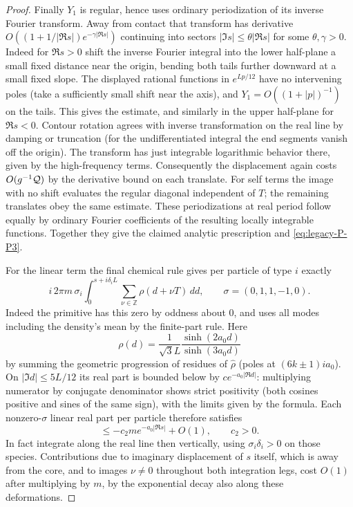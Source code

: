 \begin{proof}
Finally \(Y_1\) is regular, hence uses ordinary periodization of its inverse Fourier transform. Away from contact that transform has derivative \(O((1+1/|\Re s|)e^{-\gamma|\Re s|})\) continuing into sectors \(|\Im s|\le\theta|\Re s|\) for some \(\theta,\gamma>0\). Indeed for \(\Re s>0\) shift the inverse Fourier integral into the lower half-plane a small fixed distance near the origin, bending both tails further downward at a small fixed slope. The displayed rational functions in \(e^{Lp/12}\) have no intervening poles (take a sufficiently small shift near the axis), and \(Y_1=O((1+|p|)^{-1})\) on the tails. This gives the estimate, and similarly in the upper half-plane for \(\Re s<0\). Contour rotation agrees with inverse transformation on the real line by damping or truncation (for the undifferentiated integral the end segments vanish off the origin). The transform has just integrable logarithmic behavior there, given by the high-frequency terms. Consequently the displacement again costs \(O(g^{-1}{\cal Q})\) by the derivative bound on each translate. For self terms the image with no shift evaluates the regular diagonal independent of \(T\); the remaining translates obey the same estimate. These periodizations at real period follow equally by ordinary Fourier coefficients of the resulting locally integrable functions. Together they give the claimed analytic prescription and \eqref{eq:legacy-P-P3}.

For the linear term the final chemical rule gives per particle of type \(i\) exactly
\[
 i\,2\pi m\,\sigma_i\int_0^{s+i\delta_i L}
       \sum_{\nu\in\mathbb Z}\rho(d+\nu T)\,dd,\qquad
 \sigma=(0,1,1,-1,0).
\]
Indeed the primitive has this zero by oddness about 0, and uses all modes including the density's mean by the finite-part rule. Here
\[
 \rho(d)=\frac1{\sqrt3 L}\frac{\sinh(2a_0 d)}{\sinh(3a_0 d)}
\]
by summing the geometric progression of residues of \(\widehat\rho\) (poles at \((6k\pm1)i a_0\)). On \(|\Im d|\le 5L/12\) its real part is bounded below by \(c e^{-a_0|\Re d|}\): multiplying numerator by conjugate denominator shows strict positivity (both cosines positive and sines of the same sign), with the limits given by the formula. Each nonzero-\(\sigma\) linear real part per particle therefore satisfies
\[
 \le -c_2 m e^{-a_0|\Re s|}+O(1),\qquad c_2>0.
\]
In fact integrate along the real line then vertically, using \(\sigma_i\delta_i>0\) on those species. Contributions due to imaginary displacement of \(s\) itself, which is away from the core, and to images \(\nu\ne0\) throughout both integration legs, cost \(O(1)\) after multiplying by \(m\), by the exponential decay also along these deformations.


\end{proof}
